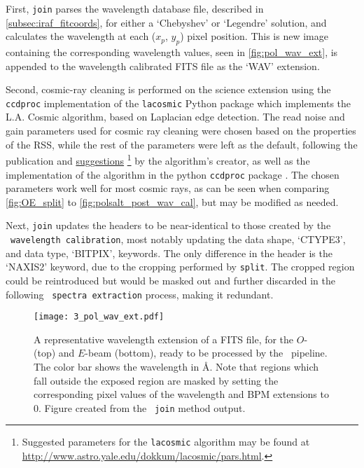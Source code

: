First, \texttt{join} parses the wavelength database file, described in \autoref{subsec:iraf_fitcoords}, for either a `Chebyshev' or `Legendre' solution, and calculates the wavelength at each ($x_{p}$, $y_{p}$) pixel position. This is new image containing the corresponding wavelength values, seen in \autoref{fig:pol_wav_ext}, is appended to the wavelength calibrated \gls{FITS} file as the `WAV' extension.

Second, cosmic-ray cleaning is performed on the science extension using the \texttt{ccdproc} implementation of the \texttt{lacosmic} Python package which implements the L.A. Cosmic algorithm, based on Laplacian edge detection. The read noise and gain parameters used for cosmic ray cleaning were chosen based on the properties of the \gls{RSS}, while the rest of the parameters were left as the default, following the publication and \href{http://www.astro.yale.edu/dokkum/lacosmic/pars.html}{suggestions}%
\footnote{Suggested parameters for the \texttt{lacosmic} algorithm may be found at \url{http://www.astro.yale.edu/dokkum/lacosmic/pars.html}.}
by the algorithm's creator, as well as the implementation of the algorithm in the python \texttt{ccdproc} package \citep{lacosmic,astroscrappy}. The chosen parameters work well for most cosmic rays, as can be seen when comparing \autoref{fig:OE_split} to \autoref{fig:polsalt_post_wav_cal}, but may be modified as needed.

Next, \texttt{join} updates the headers to be near-identical to those created by the \polsalt\ \texttt{wavelength calibration}, most notably updating the data shape, `CTYPE3', and data type, `BITPIX', keywords.
The only difference in the header is the  `NAXIS2' keyword, due to the cropping performed by \texttt{split}. The cropped region could be reintroduced but would be masked out and further discarded in the following \polsalt\ \texttt{spectra extraction} process, making it redundant.

\begin{figure}[t]
    \centering
    \texttt{[image: 3\_pol\_wav\_ext.pdf]}
    \caption{A representative wavelength extension of a \gls{FITS} file, for the $O$- (top) and $E$-beam (bottom), ready to be processed by the \polsalt\ pipeline. The color bar shows the wavelength in \AA. Note that regions which fall outside the exposed region are masked by setting the corresponding pixel values of the wavelength and \gls{BPM} extensions to $0$. Figure created from the \stops\ \texttt{join} method output.}
    \label{fig:pol_wav_ext}
\end{figure}

